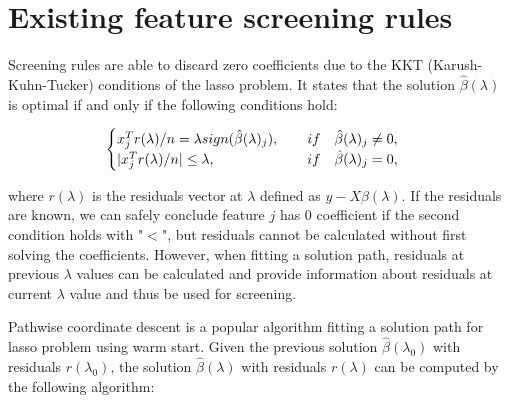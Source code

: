 \documentclass{article}
\begin{document}
\section{Existing feature screening rules}
\label{sec:existing}


Screening rules are able to discard zero coefficients due to the KKT (Karush-Kuhn-Tucker) conditions of the lasso problem. It states that the solution $\hat{\beta}(\lambda)$ is optimal if and only if the following conditions hold:

\begin{equation}
    \begin{cases}
    x_j^Tr(\lambda)/n = \lambda sign(\hat{\beta}(\lambda)_j),\qquad if\quad \hat{\beta}(\lambda)_j\neq 0,\\
    |x_j^Tr(\lambda)/n| \leq \lambda,\hfill if\quad \hat{\beta}(\lambda)_j= 0,
    \end{cases}
\end{equation}

where $r(\lambda)$ is the residuals vector at $\lambda$ defined as $y-X\hat{\beta}(\lambda)$. If the residuals are known, we can safely conclude feature $j$ has 0 coefficient if the second condition holds with "$<$", but residuals cannot be calculated without first solving the coefficients. However, when fitting a solution path, residuals at previous $\lambda$ values can be calculated and provide information about residuals at current $\lambda$ value and thus be used for screening.

Pathwise coordinate descent is a popular algorithm fitting a solution path for lasso problem using warm start. Given the previous solution $\hat{\beta}(\lambda_0)$ with residuals $r(\lambda_0)$, the solution $\hat{\beta}(\lambda)$ with residuals $r(\lambda)$ can be computed by the following algorithm:
\end{document}
